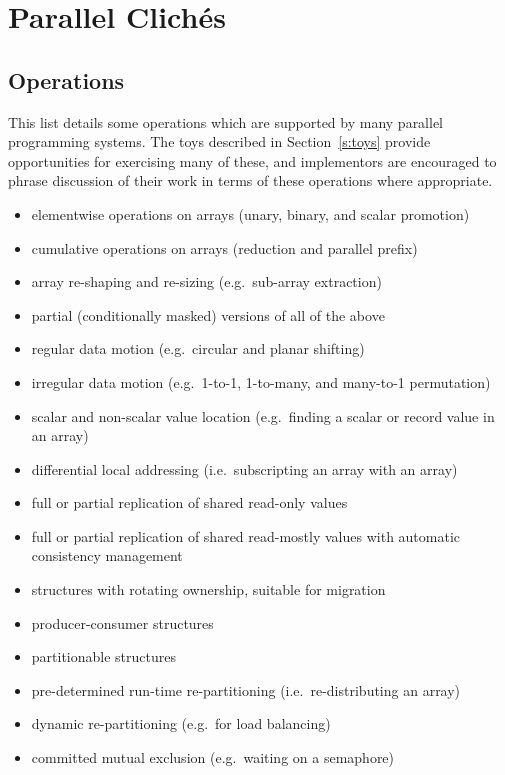 \section{Parallel Clich\'{e}s\label{s:cliche}}

\subsection{Operations\label{s:cliche-ops}}

This list details some operations which are supported by many parallel programming systems.
The toys described in Section~\ref{s:toys} provide opportunities for exercising many of these,
and implementors are encouraged to phrase discussion of their work in terms of these operations where appropriate.

\begin{itemize}
\item	elementwise operations on arrays (unary, binary, and scalar promotion)
\item	cumulative operations on arrays (reduction and parallel prefix)
\item	array re-shaping and re-sizing (e.g.\ sub-array extraction)
\item	partial (conditionally masked) versions of all of the above
\item	regular data motion (e.g.\ circular and planar shifting)
\item	irregular data motion (e.g.\ 1-to-1, 1-to-many, and many-to-1 permutation)
\item	scalar and non-scalar value location (e.g.\ finding a scalar or record value in an array)
\item	differential local addressing (i.e.\ subscripting an array with an array)
\item	full or partial replication of shared read-only values
\item	full or partial replication of shared read-mostly values with automatic consistency management
\item	structures with rotating ownership, suitable for migration
\item	producer-consumer structures
\item	partitionable structures
\item	pre-determined run-time re-partitioning (i.e.\ re-distributing an array)
\item	dynamic re-partitioning (e.g.\ for load balancing)
\item	committed mutual exclusion (e.g.\ waiting on a semaphore)

\end{itemize}
